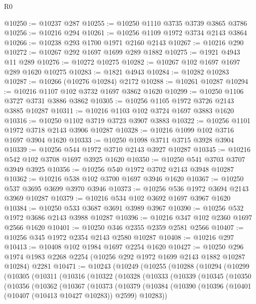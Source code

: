\begin{lexlean}{R0}
\begin{coremodule}
@10250 := @10237 @287
@10255 := @10250 @1110 @3735 @3739 @3865 @3786
@10256 := @10216 @294
@10261 := @10256 @1109 @1972 @3734 @2143 @3864
@10266 := @10238 @293 @1700 @1971 @2160 @2143
@10267 := @10216 @290
@10272 := @10267 @292 @1697 @1699 @289 @1882
@10275 := @1921 @4943 @11 @289
@10276 := @10272 @10275
@10282 := @10267 @102 @1697 @1697 @289 @1620 @10275
@10283 := @1821 @4943
@10284 := @10282 @10283
@10287 := @10266 (@10276 @10284) @2172
@10288 := @10261 @10287
@10294 := @10216 @1107 @102 @3732 @1697 @3862 @1620
@10299 := @10250 @1106 @3727 @3731 @3886 @3862
@10305 := @10256 @1105 @1972 @3726 @2143 @3885 @10287
@10311 := @10216 @1103 @102 @3724 @1697 @3883 @1620
@10316 := @10250 @1102 @3719 @3723 @3907 @3883
@10322 := @10256 @1101 @1972 @3718 @2143 @3906 @10287
@10328 := @10216 @1099 @102 @3716 @1697 @3904 @1620
@10333 := @10250 @1098 @3711 @3715 @3928 @3904
@10339 := @10256 @544 @1972 @3710 @2143 @3927 @10287
@10345 := @10216 @542 @102 @3708 @1697 @3925 @1620
@10350 := @10250 @541 @3703 @3707 @3949 @3925
@10356 := @10256 @540 @1972 @3702 @2143 @3948 @10287
@10362 := @10216 @538 @102 @3700 @1697 @3946 @1620
@10367 := @10250 @537 @3695 @3699 @3970 @3946
@10373 := @10256 @536 @1972 @3694 @2143 @3969 @10287
@10379 := @10216 @534 @102 @3692 @1697 @3967 @1620
@10384 := @10250 @533 @3687 @3691 @3989 @3967
@10390 := @10256 @532 @1972 @3686 @2143 @3988 @10287
@10396 := @10216 @347 @102 @2360 @1697 @2566 @1620
@10401 := @10250 @346 @2355 @2359 @2581 @2566
@10407 := @10256 @345 @1972 @2354 @2143 @2580 @10287
@10408 := @10216 @297
@10413 := @10408 @102 @1984 @1697 @2254 @1620
@10427 := @10250
    @296
    @1974
    @1983
    @2268
    @2254
    (@10256 @292 @1972 @1699 @2143 @1882 @10287 @10284)
    @2281
@10471 := @10243
    (@10249
      (@10255
        (@10288
          (@10294
            (@10299
              (@10305
                (@10311
                  (@10316
                    (@10322
                      (@10328
                        (@10333
                          (@10339
                            (@10345
                              (@10350
                                (@10356
                                  (@10362
                                    (@10367
                                      (@10373
                                        (@10379
                                          (@10384
                                            (@10390
                                              (@10396
                                                (@10401 (@10407 (@10413 @10427 @10283)) @2599)
                                                @10283))

\end{coremodule}
\end{lexlean}
